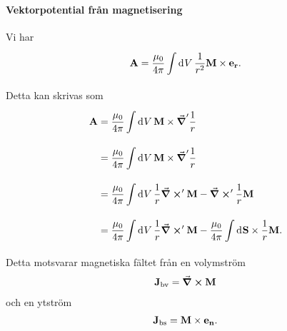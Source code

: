 \paragraph{Vektorpotential från magnetisering}
Vi har
\begin{align*}
	\vb{A} = \frac{\mu_{0}}{4\pi}\int\limits_{}^{}\dd[]{V}\frac{1}{r^{2}}\vb{M}\times\vb{e}_{\vb{r}}.
\end{align*}
Detta kan skrivas som
\begin{align*}
	\vb{A} &= \frac{\mu_{0}}{4\pi}\int\limits_{}^{}\dd[]{V}\vb{M}\times\grad'{\frac{1}{r}} \\
	       &= \frac{\mu_{0}}{4\pi}\int\limits_{}^{}\dd[]{V}\vb{M}\times\grad'{\frac{1}{r}} \\
	       &= \frac{\mu_{0}}{4\pi}\int\limits_{}^{}\dd[]{V}\frac{1}{r}\curl'{\vb{M}} - \curl'{\frac{1}{r}\vb{M}} \\
	       &= \frac{\mu_{0}}{4\pi}\int\limits_{}^{}\dd[]{V}\frac{1}{r}\curl'{\vb{M}} - \frac{\mu_{0}}{4\pi}\int\limits_{}^{}\dd[]{\vb{S}}\times\frac{1}{r}\vb{M}.
\end{align*}
Detta motsvarar magnetiska fältet från en volymström
\begin{align*}
	\vb{J}_{\text{bv}} = \curl{\vb{M}}
\end{align*}
och en ytström
\begin{align*}
	\vb{J}_{\text{bs}} = \vb{M}\times\vb{e}_{\vb{n}}.
\end{align*}

